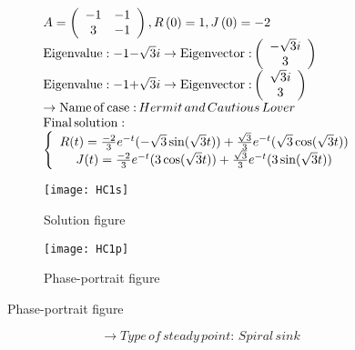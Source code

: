 \documentclass[a4paper]{article}
\begin{document}
\[\begin{array}{l}
A = \left( {\begin{array}{*{20}{c}}
{ - 1}&{ - 1}\\
3&{ - 1}
\end{array}} \right),R\left( 0 \right) = 1,J\left( 0 \right) =  - 2\\
{\rm{Eigenvalue: - 1 - }}\sqrt 3 i \to {\rm{Eigenvector:}}\left( {\begin{array}{*{20}{c}}
{ - \sqrt 3 i}\\
3
\end{array}} \right)\\
{\rm{Eigenvalue: - 1 + }}\sqrt 3 i \to {\rm{Eigenvector:}}\left( {\begin{array}{*{20}{c}}
{\sqrt 3 i}\\
3
\end{array}} \right)\\
 \to {\rm{Name}}\,{\rm{of}}\,{\rm{case:}}\,Hermit\,and\,Cautious\,Lover\\
{\rm{Final}}\,{\rm{solution:}}\\
\left\{ {\begin{array}{*{20}{c}}
{R(t) = \frac{{ - 2}}{3}{e^{ - t}}( - \sqrt 3 \sin (\sqrt 3 t)) + \frac{{\sqrt 3 }}{3}{e^{ - t}}(\sqrt 3 \cos (\sqrt 3 t))}\\
{J(t) = \frac{{ - 2}}{3}{e^{ - t}}(3\cos (\sqrt 3 t)) + \frac{{\sqrt 3 }}{3}{e^{ - t}}(3\sin (\sqrt 3 t))}
\end{array}} \right.
\end{array}\]
\begin{figure}[H]
\centering
\begin{subfigure}{.5\textwidth}
  \centering
  \texttt{[image: HC1s]}
  \caption*{Solution figure}
\end{subfigure}%
\begin{subfigure}{.5\textwidth}
  \centering
  \texttt{[image: HC1p]}
  \caption*{Phase-portrait figure}
\end{subfigure}
\end{figure}
\[  \to  Type\,of\,steady\,point:\,Spiral\,sink\]
\end{document}
